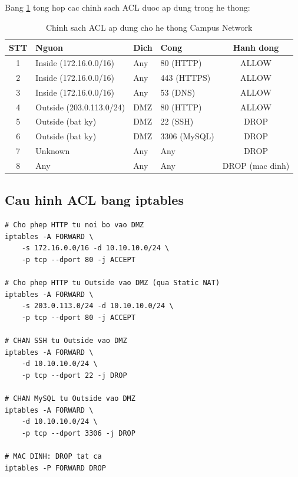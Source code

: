 Bang \ref{tab:acl_policy} tong hop cac chinh sach ACL duoc ap dung trong he thong:

\begin{table}[H]
\centering
\caption{Chinh sach ACL ap dung cho he thong Campus Network}
\vspace{0.3cm}
\begin{tabularx}{\textwidth}{|c|>{\raggedright\arraybackslash}X|l|l|c|}
    \hline
    \textbf{STT} & \textbf{Nguon} & \textbf{Dich} & \textbf{Cong} & \textbf{Hanh dong} \\ \hline
    1 & Inside (172.16.0.0/16) & Any & 80 (HTTP) & ALLOW \\ \hline
    2 & Inside (172.16.0.0/16) & Any & 443 (HTTPS) & ALLOW \\ \hline
    3 & Inside (172.16.0.0/16) & Any & 53 (DNS) & ALLOW \\ \hline
    4 & Outside (203.0.113.0/24) & DMZ & 80 (HTTP) & ALLOW \\ \hline
    5 & Outside (bat ky) & DMZ & 22 (SSH) & DROP \\ \hline
    6 & Outside (bat ky) & DMZ & 3306 (MySQL) & DROP \\ \hline
    7 & Unknown & Any & Any & DROP \\ \hline
    8 & Any & Any & Any & DROP (mac dinh) \\ \hline
\end{tabularx}
\label{tab:acl_policy}
\end{table}

\subsection{Cau hinh ACL bang iptables}

\begin{lstlisting}
# Cho phep HTTP tu noi bo vao DMZ
iptables -A FORWARD \
    -s 172.16.0.0/16 -d 10.10.10.0/24 \
    -p tcp --dport 80 -j ACCEPT

# Cho phep HTTP tu Outside vao DMZ (qua Static NAT)
iptables -A FORWARD \
    -s 203.0.113.0/24 -d 10.10.10.0/24 \
    -p tcp --dport 80 -j ACCEPT

# CHAN SSH tu Outside vao DMZ
iptables -A FORWARD \
    -d 10.10.10.0/24 \
    -p tcp --dport 22 -j DROP

# CHAN MySQL tu Outside vao DMZ
iptables -A FORWARD \
    -d 10.10.10.0/24 \
    -p tcp --dport 3306 -j DROP

# MAC DINH: DROP tat ca
iptables -P FORWARD DROP
\end{lstlisting}

